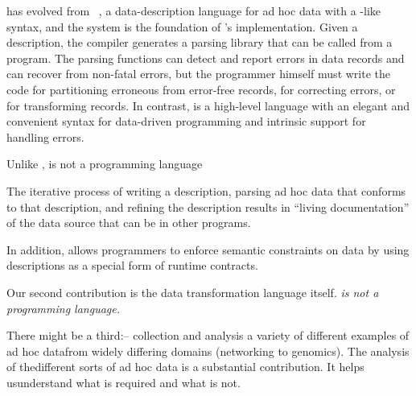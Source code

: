 \datatype{} has evolved from \pads{}~\cite{fisher+:pads}, a
data-description language for ad hoc data with a \C{}-like syntax, and
the \pads{} system is the foundation of \datatype{}'s implementation.
Given a \pads{} description, the \pads{} compiler generates a parsing
library that can be called from a \C{} program.  The parsing functions
can detect and report errors in data records and can recover from
non-fatal errors, but the programmer himself must write the code for
partitioning erroneous from error-free records, for correcting errors,
or for transforming records.  In contrast, \datatype{} is a high-level
language with an elegant and convenient syntax for data-driven
programming and intrinsic support for handling errors.



Unlike \datatype{},
\pads{} is not a programming language

The iterative process of writing a \datatype{} description, parsing ad
hoc data that conforms to that description, and refining the
description results in ``living documentation'' of the data source
that can be in other \datatype{} programs.  


In addition,
\datatype{} allows programmers to enforce semantic constraints on
data by using \datatype{} descriptions as a special form of runtime
contracts. 

Our second contribution is the data transformation language itself.
{\em \pads{} is not a programming language.}  
 
There might be a third:--
collection and analysis a variety of different examples of ad hoc
datafrom widely differing domains (networking to genomics).  The
analysis of thedifferent sorts of ad hoc data is a substantial
contribution.  It helps usunderstand what is required and what is not.

